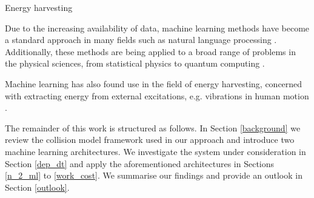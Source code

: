 Energy harvesting 

Due to the increasing availability of data, machine learning methods have become a standard approach in many fields such as natural language processing \cite{DBLP:journals/corr/VaswaniSPUJGKP17}.
Additionally, these methods are being applied to a broad range of problems in the physical sciences, from statistical physics to quantum computing \cite{Carleo_2019, wise2021using}.

Machine learning has also found use in the field of energy harvesting, concerned with extracting energy from external excitations, e.g. vibrations in human motion \cite{Liu2019}.


The remainder of this work is structured as follows.
In Section \ref{background} we review the collision model framework used in our approach and introduce two machine learning architectures.
We investigate the system under consideration in Section \ref{dep_dt} and apply the aforementioned architectures in Sections \ref{n_2_ml} to \ref{work_cost}.
We summarise our findings and provide an outlook in Section \ref{outlook}.